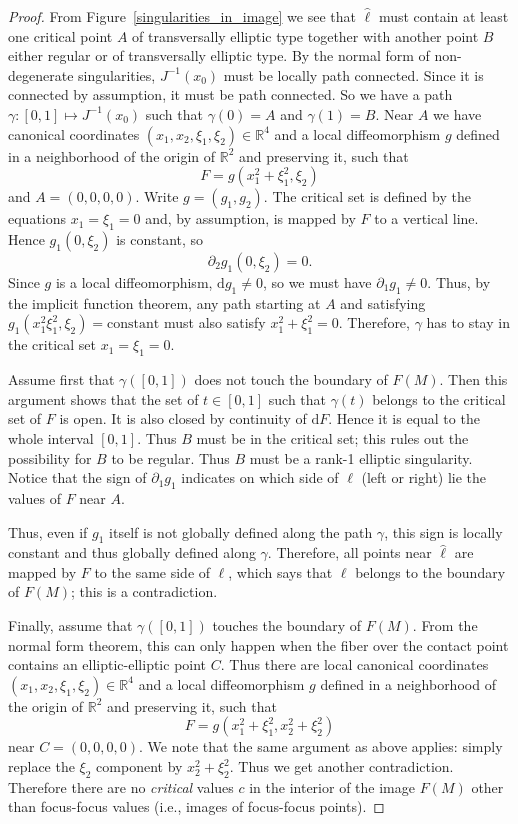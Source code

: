 \documentclass[11pt]{article}
\newcommand{\DD}{\mathrm{d}}
\newcommand{\RM}{\mathbb{R}}
\begin{document}
\begin{proof}
  From Figure~\ref{singularities_in_image} we see that $\hat{\ell}$
  must contain at least one critical point $A$ of transversally
  elliptic type together with another point $B$ either regular or of
  transversally elliptic type. By the normal form of non-degenerate
  singularities, $J^{-1}(x_0)$ must be locally path connected. Since
  it is connected by assumption, it must be path connected. So we have
  a path $\gamma: [0,1]\mapsto J^{-1}(x_0)$ such that $\gamma(0)=A$
  and $\gamma(1)=B$. Near $A$ we have canonical coordinates
  $(x_1,x_2,\xi_1,\xi_2)\in\RM^4$ and a local diffeomorphism $g$
  defined in a neighborhood of the origin of $\mathbb{R}^2$ and
  preserving it, such that
$$
F=g(x_1^2+\xi_1^2,\xi_2)
$$ 
and $A=(0,0,0,0)$. Write $g=(g_1,g_2)$. The critical set is defined by
the equations $x_1=\xi_1=0$ and, by assumption, is mapped by $F$ to a
vertical line. Hence $g_1(0,\xi_2)$ is constant, so
$$
\partial_2g_1(0,\xi_2)=0.
$$ 
Since $g$ is a local diffeomorphism, $\DD
g_1\neq 0$, so we must have $\partial_1 g_1 \neq 0$. Thus, by the
implicit function theorem, any path starting at $A$ and satisfying
$g_1(x_1^2\xi_1^2,\xi_2) =\text{constant}$ must also satisfy
$x_1^2+\xi_1^2=0$.  Therefore, $\gamma$ has to stay in the critical
set $x_1=\xi_1=0$.

Assume first that $\gamma([0,1])$ does not touch the boundary of
$F(M)$. Then this argument shows that the set of $t\in[0,1]$ such that
$\gamma(t)$ belongs to the critical set of $F$ is open. It is also
closed by continuity of $\DD F$.  Hence it is equal to the whole
interval $[0,1]$. Thus $B$ must be in the critical set; this rules out
the possibility for $B$ to be regular. Thus $B$ must be a rank-1
elliptic singularity.  Notice that the sign of $\partial_1 g_1$
indicates on which side of $\ell$ (left or right) lie the values of
$F$ near $A$.
  
Thus, even if $g_1$ itself is not globally defined along the path
$\gamma$, this sign is locally constant and thus globally defined
along $\gamma$. Therefore, all points near $\hat{\ell}$ are mapped by
$F$ to the same side of $\ell$, which says that $\ell$ belongs to the
boundary of $F(M)$; this is a contradiction.
  
Finally, assume that $\gamma([0,1])$ touches the boundary of
$F(M)$. From the normal form theorem, this can only happen when the
fiber over the contact point contains an elliptic-elliptic point
$C$. Thus there are local canonical coordinates
$(x_1,x_2,\xi_1,\xi_2)\in\mathbb{R}^4$ and a local diffeomorphism $g$
defined in a neighborhood of the origin of $\mathbb{R}^2$ and
preserving it, such that
$$
F=g(x_1^2+\xi_1^2,x_2^2+\xi_2^2)
$$ 
near $C=(0,0,0,0)$. We note that the same argument as above applies:
simply replace the $\xi_2$ component by $x_2^2+\xi_2^2$. Thus we get
another contradiction.  Therefore there are no \emph{critical} values
$c$ in the interior of the image $F(M)$ other than focus-focus values
(i.e., images of focus-focus points).


\end{proof}
\end{document}
